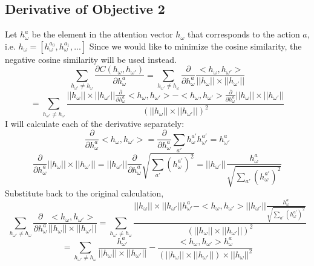 \documentclass{article}
\begin{document}
	\subsection{Derivative of Objective 2}
	Let $h_\omega^a$ be the element in the attention vector $h_\omega$ that corresponds to the action $a$, i.e. $h_\omega = [h_\omega^{a_0}, h_\omega^{a_1}, ...]$
	Since we would like to minimize the cosine similarity, the negative cosine similarity will be used instead.
	$$\sum_{h_{\omega '} \neq h_\omega} \frac{\partial C(h_\omega, h_{\omega '})}{\partial h_\omega^a} = \sum_{h_{\omega '} \neq h_\omega} \frac{\partial}{\partial h_\omega^a} \frac{<h_\omega, h_{\omega '}>}{||h_\omega||\times||h_{\omega '}||}$$
	$$= \sum_{h_{\omega '} \neq h_\omega} \frac{||h_\omega||\times||h_{\omega '}|| \frac{\partial}{\partial h_\omega^a} <h_\omega, h_{\omega '}> - <h_\omega, h_{\omega '}> \frac{\partial}{\partial h_\omega^a} ||h_\omega||\times||h_{\omega '}||}{(||h_\omega||\times||h_{\omega '}||)^2}$$
	I will calculate each of the derivative separately:
	$$\frac{\partial}{\partial h_\omega^a} <h_\omega, h_{\omega '}> = \frac{\partial}{\partial h_\omega^a} \sum_{a'}h_\omega^{a'} h_{\omega '}^{a'} = h_{\omega '}^a$$
	$$\frac{\partial}{\partial h_\omega^a} ||h_\omega||\times||h_{\omega '}|| = ||h_{\omega '}|| \frac{\partial}{\partial h_\omega^a} \sqrt{\sum_{a'}(h_\omega^{a'})^2} = ||h_{\omega '}|| \frac{h_\omega^a}{\sqrt{\sum_{a'}(h_\omega^{a'})^2}}$$
	Substitute back to the original calculation,
	$$\sum_{h_{\omega '} \neq h_\omega} \frac{\partial}{\partial h_\omega^a} \frac{<h_\omega, h_{\omega '}>}{||h_\omega||\times||h_{\omega '}||} = \sum_{h_{\omega '} \neq h_\omega} \frac{||h_\omega||\times||h_{\omega '}|| h_{\omega '}^a - <h_\omega, h_{\omega '}> ||h_{\omega '}|| \frac{h_\omega^a}{\sqrt{\sum_{a'}(h_\omega^{a'})^2}}}{(||h_\omega||\times||h_{\omega '}||)^2}$$
	$$= \sum_{h_{\omega '} \neq h_\omega} \frac{h_{\omega '}^a}{||h_\omega||\times||h_{\omega '}||} - \frac{<h_\omega, h_{\omega '}> h_\omega^a}{(||h_\omega||\times||h_{\omega '}||)\times||h_{\omega}||^2}$$
\end{document}
